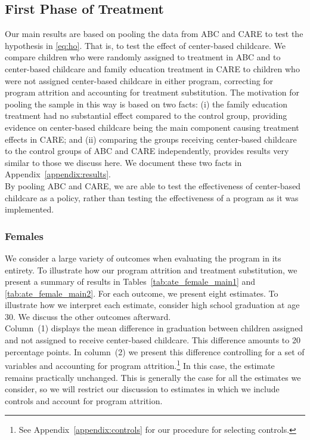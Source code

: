 \subsection{First Phase of Treatment} \label{section:center}

\noindent Our main results are based on pooling the data from ABC and CARE to test the hypothesis in \eqref{eq:ho}. That is, to test the effect of center-based childcare. We compare children who were randomly assigned to treatment in ABC and to center-based childcare and family education treatment in CARE to children who were not assigned center-based childcare in either program, correcting for program attrition and accounting for treatment substitution. The motivation for pooling the sample in this way is based on two facts: (i) the family education treatment had no substantial effect compared to the control group, providing evidence on center-based childcare being the main component causing treatment effects in CARE; and (ii) comparing the groups receiving center-based childcare to the control groups of ABC and CARE independently, provides results very similar to those we discuss here. We document these two facts in Appendix~\ref{appendix:results}.\\

\noindent By pooling ABC and CARE, we are able to test the effectiveness of center-based childcare as a policy, rather than testing the effectiveness of a program as it was implemented.\\

\subsubsection{Females} \label{section:centerfemales}

\noindent We consider a large variety of outcomes when evaluating the program in its entirety. To illustrate how our program attrition and treatment substitution, we present a summary of results in Tables~\ref{tab:ate_female_main1} and \ref{tab:ate_female_main2}. For each outcome, we present eight estimates. To illustrate how we interpret each estimate, consider high school graduation at age 30. We discuss the other outcomes afterward.\\

\noindent Column~(1) displays the mean difference in graduation between children assigned and not assigned to receive center-based childcare. This difference amounts to 20 percentage points. In column~(2) we present this difference controlling for a set of variables and accounting for program attrition.\footnote{See Appendix~\ref{appendix:controls} for our procedure for selecting controls.} In this case, the estimate remains practically unchanged. This is generally the case for all the estimates we consider, so we will restrict our discussion to estimates in which we include controls and account for program attrition.\\

